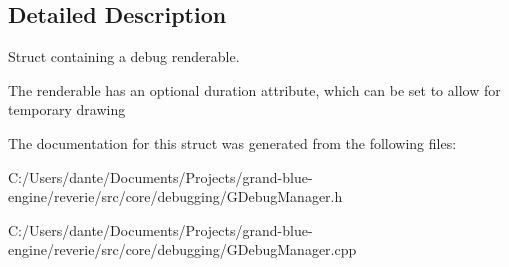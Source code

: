 \subsection{Detailed Description}
Struct containing a debug renderable. 

The renderable has an optional duration attribute, which can be set to allow for temporary drawing 

The documentation for this struct was generated from the following files\+:\begin{DoxyCompactItemize}
\item 
C\+:/\+Users/dante/\+Documents/\+Projects/grand-\/blue-\/engine/reverie/src/core/debugging/G\+Debug\+Manager.\+h\item 
C\+:/\+Users/dante/\+Documents/\+Projects/grand-\/blue-\/engine/reverie/src/core/debugging/G\+Debug\+Manager.\+cpp\end{DoxyCompactItemize}
